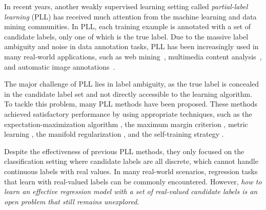 \documentclass[letterpaper]{article} %
\begin{document}
In recent years, another weakly supervised learning setting called \emph{partial-label learning} (PLL) \cite{cour2011learning} has received much attention from the machine learning and data mining communities. In PLL, each training example is annotated with a set of candidate labels, only one of which is the true label. Due to the massive label ambiguity and noise in data annotation tasks, PLL has been increasingly used in many real-world applications, such as web mining~\cite{luo2010learning}, multimedia content analysis~\cite{zeng2013learning}, and automatic image annotations~\cite{chen2018learning}.

The major challenge of PLL lies in label ambiguity, as the true label is concealed in the candidate label set and not directly accessible to the learning algorithm. To tackle this problem, many PLL methods have been proposed. These methods achieved satisfactory performance by using appropriate techniques, such as the expectation-maximization algorithm \cite{jin2003learning,wang2022pico}, the maximum margin criterion \cite{nguyen2008classification}, metric learning \cite{gong2021discriminative,liu2018metric}, the manifold regularization \cite{zhang2015solving,zhang2016partial,gong2018regularization,wang2019adaptive}, and the self-training strategy \cite{feng2019partial,lv2020progressive,feng2020provably,wen2021leveraged}.

Despite the effectiveness of previous PLL methods, they only focused on the classification setting where candidate labels are all discrete, which cannot handle continuous labels with real values. In many real-world scenarios, regression tasks that learn with real-valued labels can be commonly encountered.
However, \emph{how to learn an effective regression model with a set of real-valued candidate labels is an open problem that still remains unexplored}.
\end{document}
